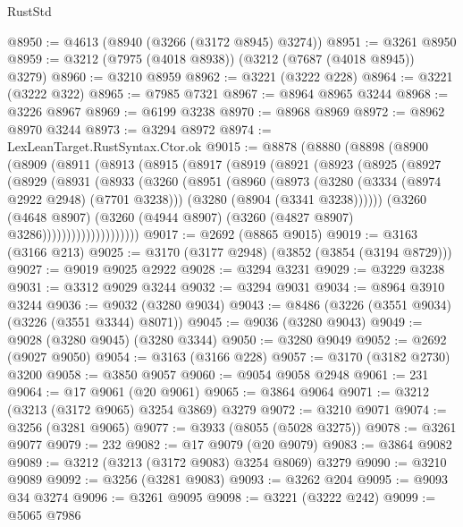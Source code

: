 \begin{lexlean}{RustStd}
\begin{coremodule}
@8950 := @4613 (@8940 (@3266 (@3172 @8945) @3274))
@8951 := @3261 @8950
@8959 := @3212 (@7975 (@4018 @8938)) (@3212 (@7687 (@4018 @8945)) @3279)
@8960 := @3210 @8959
@8962 := @3221 (@3222 @228)
@8964 := @3221 (@3222 @322)
@8965 := @7985 @7321
@8967 := @8964 @8965 @3244
@8968 := @3226 @8967
@8969 := @6199 @3238
@8970 := @8968 @8969
@8972 := @8962 @8970 @3244
@8973 := @3294 @8972
@8974 := LexLeanTarget.RustSyntax.Ctor.ok
@9015 := @8878
    (@8880
      (@8898
        (@8900
          (@8909
            (@8911
              (@8913
                (@8915
                  (@8917
                    (@8919
                      (@8921
                        (@8923
                          (@8925
                            (@8927
                              (@8929
                                (@8931
                                  (@8933
                                    (@3260
                                      (@8951
                                        (@8960
                                          (@8973
                                            (@3280 (@3334 (@8974 @2922 @2948) (@7701 @3238)))
                                            (@3280 (@8904 (@3341 @3238))))))
                                      (@3260
                                        (@4648 @8907)
                                        (@3260
                                          (@4944 @8907)
                                          (@3260 (@4827 @8907) @3286))))))))))))))))))))
@9017 := @2692 (@8865 @9015)
@9019 := @3163 (@3166 @213)
@9025 := @3170 (@3177 @2948) (@3852 (@3854 (@3194 @8729)))
@9027 := @9019 @9025 @2922
@9028 := @3294 @3231
@9029 := @3229 @3238
@9031 := @3312 @9029 @3244
@9032 := @3294 @9031
@9034 := @8964 @3910 @3244
@9036 := @9032 (@3280 @9034)
@9043 := @8486 (@3226 (@3551 @9034) (@3226 (@3551 @3344) @8071))
@9045 := @9036 (@3280 @9043)
@9049 := @9028 (@3280 @9045) (@3280 @3344)
@9050 := @3280 @9049
@9052 := @2692 (@9027 @9050)
@9054 := @3163 (@3166 @228)
@9057 := @3170 (@3182 @2730) @3200
@9058 := @3850 @9057
@9060 := @9054 @9058 @2948
@9061 := 231
@9064 := @17 @9061 (@20 @9061)
@9065 := @3864 @9064
@9071 := @3212 (@3213 (@3172 @9065) @3254 @3869) @3279
@9072 := @3210 @9071
@9074 := @3256 (@3281 @9065)
@9077 := @3933 (@8055 (@5028 @3275))
@9078 := @3261 @9077
@9079 := 232
@9082 := @17 @9079 (@20 @9079)
@9083 := @3864 @9082
@9089 := @3212 (@3213 (@3172 @9083) @3254 @8069) @3279
@9090 := @3210 @9089
@9092 := @3256 (@3281 @9083)
@9093 := @3262 @204
@9095 := @9093 @34 @3274
@9096 := @3261 @9095
@9098 := @3221 (@3222 @242)
@9099 := @5065 @7986

\end{coremodule}
\end{lexlean}
